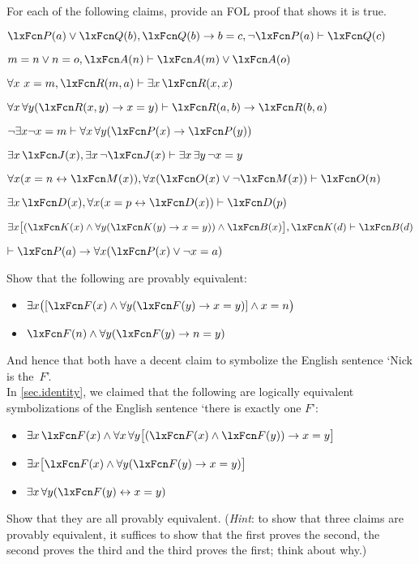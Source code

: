 \practiceproblems
\problempart
\label{pr.identity}
For each of the following claims, provide an FOL proof that shows it
is true.
\begin{compactlist}
\item $\atom{P}{a} \eor \atom{Q}{b}, \atom{Q}{b} \eif b=c, \enot\atom{P}{a} \proves \atom{Q}{c}$
\item $m=n \eor n=o, \atom{A}{n} \proves \atom{A}{m} \eor \atom{A}{o}$
\item $\forall x\ x=m, \atom{R}{m,a} \proves \exists x\,\atom{R}{x,x}$
\item $\forall x\,\forall y(\atom{R}{x,y} \eif x=y)\proves \atom{R}{a,b} \eif \atom{R}{b,a}$
\item $\enot \exists x\enot x = m \proves \forall x\,\forall y (\atom{P}{x} \eif \atom{P}{y})$
\item $\exists x\,\atom{J}{x}, \exists x\, \enot\atom{J}{x}\proves \exists x\, \exists y\, \enot x = y$
\item $\forall x(x=n \eiff \atom{M}{x}), \forall x(\atom{O}{x} \eor \enot \atom{M}{x})\proves \atom{O}{n}$
\item $\exists x\,\atom{D}{x}, \forall x(x=p \eiff \atom{D}{x})\proves \atom{D}{p}$
\item $\exists x\bigl[(\atom{K}{x} \eand \forall y(\atom{K}{y} \eif x=y)) \eand \atom{B}{x}\bigr], \atom{K}{d} \proves \atom{B}{d}$
\item $\proves \atom{P}{a} \eif \forall x(\atom{P}{x} \eor \enot x = a)$
\end{compactlist}

\problempart
Show that the following are provably equivalent:
\begin{itemize}
\item $\exists x \bigl([\atom{F}{x} \eand \forall y (\atom{F}{y} \eif x = y)] \eand x = n\bigr)$
\item $\atom{F}{n} \eand \forall y (\atom{F}{y} \eif n= y)$
\end{itemize}
And hence that both have a decent claim to symbolize the English sentence `Nick is the~$F$'.\\

\problempart
In \cref{sec.identity}, we claimed that the following are logically equivalent symbolizations of the English sentence `there is exactly one $F$':
\begin{itemize}
\item $\exists x\,\atom{F}{x} \eand \forall x\, \forall y \bigl[(\atom{F}{x} \eand \atom{F}{y}) \eif x = y\bigr]$
\item $\exists x \bigl[\atom{F}{x} \eand \forall y (\atom{F}{y} \eif x = y)\bigr]$
\item $\exists x\, \forall y (\atom{F}{y} \eiff x = y)$
\end{itemize}
Show that they are all provably equivalent. (\emph{Hint}: to show that three claims are provably equivalent, it suffices to show that the first proves the second, the second proves the third and the third proves the first; think about why.)


